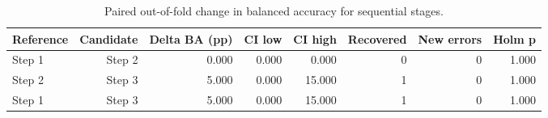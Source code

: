 \begin{table}[t]
\centering
\caption{Paired out-of-fold change in balanced accuracy for sequential stages.}
\label{tab:paired_stage_changes}
\small
\begin{tabular}{lrrrrrrr}
\toprule
Reference & Candidate & Delta BA (pp) & CI low & CI high & Recovered & New errors & Holm p \\
\midrule
Step 1 & Step 2 & 0.000 & 0.000 & 0.000 & 0 & 0 & 1.000 \\
Step 2 & Step 3 & 5.000 & 0.000 & 15.000 & 1 & 0 & 1.000 \\
Step 1 & Step 3 & 5.000 & 0.000 & 15.000 & 1 & 0 & 1.000 \\
\bottomrule
\end{tabular}
\end{table}
